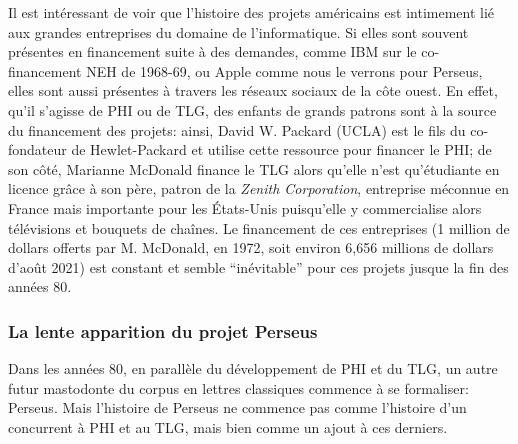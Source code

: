 Il est intéressant de voir que l'histoire des projets américains est intimement lié aux grandes entreprises du domaine de l'informatique. Si elles sont souvent présentes en financement suite à des demandes, comme IBM sur le co-financement NEH de 1968-69, ou Apple comme nous le verrons pour Perseus, elles sont aussi présentes à travers les réseaux sociaux de la côte ouest. En effet, qu'il s'agisse de PHI ou de TLG, des enfants de grands patrons sont à la source du financement des projets: ainsi, David W. Packard (UCLA) est le fils du co-fondateur de Hewlet-Packard et utilise cette ressource pour financer le PHI; de son côté, Marianne McDonald finance le TLG alors qu'elle n'est qu'étudiante en licence grâce à son père, patron de la \textit{Zenith Corporation}, entreprise méconnue en France mais importante pour les États-Unis puisqu'elle y commercialise alors télévisions et bouquets de chaînes. Le financement de ces entreprises (1 million de dollars offerts par M. McDonald, en 1972, soit environ 6,656 millions de dollars d'août 2021) est constant et semble \enquote{inévitable} pour ces projets jusque la fin des années 80.

\subsubsection{La lente apparition du projet Perseus}

Dans les années 80, en parallèle du développement de PHI et du TLG, un autre futur mastodonte du corpus en lettres classiques commence à se formaliser: Perseus. Mais l'histoire de Perseus ne commence pas comme l'histoire d'un concurrent à PHI et au TLG, mais bien comme un ajout à ces derniers. 


